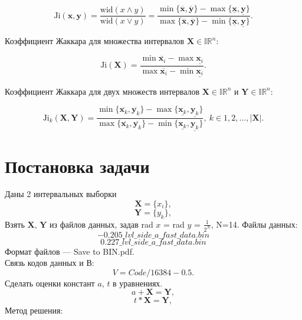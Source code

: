 \documentclass[10pt]{article}
\begin{document}
\begin{itemize}
  \begin{equation*}
    \text{Ji} (\mathbf{x}, \mathbf{y})
      = \frac{\text{wid} (x \land y)}{\text{wid} (x \lor y)}
      = \frac{\min \{ \overline{\mathbf{x}}, \overline{\mathbf{y}} \} - \max \{ \underline{\mathbf{x}}, \underline{\mathbf{y}} \}}
        {\max\{ \overline{\mathbf{x}}, \overline{\mathbf{y}} \} - \min \{ \underline{\mathbf{x}}, \underline{\mathbf{y}} \}}.
  \end{equation*}

  Коэффициент Жаккара для множества интервалов
  \( \mathbf{X} \in \mathbb{IR}^n \):

  \begin{equation*}
    \text{Ji} (\mathbf{X})
      = \frac{\min \overline{\mathbf{x}_i} - \max \underline{\mathbf{x}_i}}
        {\max \overline{\mathbf{x}_i} - \min \underline{\mathbf{x}_i}}.
  \end{equation*}

  Коэффициент Жаккара для двух множеств интервалов
  \( \mathbf{X} \in \mathbb{IR}^n \) и \( \mathbf{Y} \in \mathbb{IR}^n \):

  \begin{equation*}
    \text{Ji}_k (\mathbf{X}, \mathbf{Y})
      = \frac{\min \{ \overline{\mathbf{x}_k}, \overline{\mathbf{y}_k} \} - \max \{ \underline{\mathbf{x}_k}, \underline{\mathbf{y}_k} \}}
        {\max\{ \overline{\mathbf{x}_k}, \overline{\mathbf{y}_k} \} - \min \{ \underline{\mathbf{x}_k}, \underline{\mathbf{y}_k} \}},
      \ k \in 1, 2, \dots, |\mathbf{X}|.
  \end{equation*}
\end{itemize}
\vspace{0.5cm}

\section{Постановка задачи}
Даны 2 интервальных выборки
\begin{equation}
    \mathbf{X}=\{x_i\},
\end{equation}
\begin{equation}
    \mathbf{Y}=\{y_k\},
\end{equation}
Взять $\mathbf{X}$, $\mathbf{Y}$ из файлов данных, задав rad $x$ = rad $y$ = $\frac{1}{2^N}$, N=14.
Файлы данных:
\[−0.205\_lvl\_side\_a\_fast\_data.bin\]
\[0.227\_lvl\_side\_a\_fast\_data.bin\]
Формат файлов — Save to BIN.pdf.\\
Связь кодов данных и В:\\
\[V = Code/16384 − 0.5.\]
Сделать оценки констант $a$, $t$ в уравнениях.
\begin{equation}
    a+\mathbf{X}=\mathbf{Y},
\end{equation}
\begin{equation}
    t*\mathbf{X}=\mathbf{Y},
\end{equation}
Метод решения:
\end{document}
